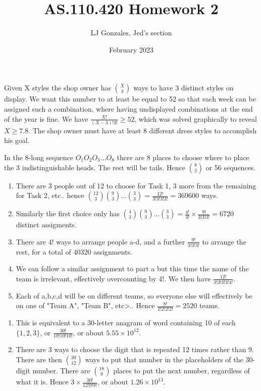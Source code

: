 \documentclass{article}
\title{AS.110.420 Homework 2}
\author{LJ Gonzales, Jed's section}
\date{February 2023}
\begin{document}
\maketitle

\begin{prob}
Given X styles the shop owner has ${X \choose 3}$ ways to have 3 distinct styles on display. We want this number to at least be equal to 52 so that each week can be assigned such a combination, where having undisplayed combinations at the end of the year is fine. We have $\frac{X!}{(X-3)!3!}\geq52$, which was solved graphically to reveal $X\geq7.8$. The shop owner must have at least 8 different dress styles to accomplish his goal.
\end{prob}

\begin{prob}
    In the 8-long sequence $O_1O_2O_3\dots O_8$ there are 8 places to choose where to place the 3 indistinguishable heads. The rest will be tails. Hence ${8 \choose 3}$ or 56 sequences.
\end{prob}

\begin{prob}
    \begin{enumerate}
        \item There are 3 people out of 12 to choose for Task 1, 3 more from the remaining for Task 2, etc.. hence ${12 \choose 3}{9 \choose 3}\dots {3\choose3}=\frac{12!}{3!3!3!3!}=369600$ ways.
        \item Similarly the first choice only has ${4\choose3}{9\choose3}\dots{3\choose3}=\frac{4!}{3!}\times\frac{9!}{3!3!3!}=6720$ distinct assigments.
        \item There are $4!$ ways to arrange people a-d, and a further $\frac{9!}{3!3!3!}$ to arrange the rest, for a total of 40320 assignments.
        \item We can follow a similar assignment to part a but this time the name of the team is irrelevant, effectively overcounting by 4!. We then have $\frac{12!}{3!3!3!3!4!}$.
        \item Each of a,b,c,d will be on different teams, so everyone else will effectively be on one of "Team A", "Team B", etc>.. Hence $\frac{8!}{2!2!2!2!}= 2520$ teams.
    \end{enumerate}
\end{prob}

\begin{prob}
    \begin{enumerate}
        \item This is equivalent to a 30-letter anagram of  word containing 10 of each $\{1,2,3\}$, or $\frac{30!}{10!10!10!}$, or about $5.55\times10^{12}$.
        \item There are 3 ways to choose the digit that is repeated 12 times rather than 9. There are then ${30 \choose 12}$ ways to put that number in the placeholders of the 30-digit number. There are ${18 \choose 9}$ places to put the next number, regardless of what it is. Hence $3\times\frac{30!}{12!9!9!}$, or about $1.26\times10^{13}$.
    \end{enumerate}
\end{prob}
\end{document}
